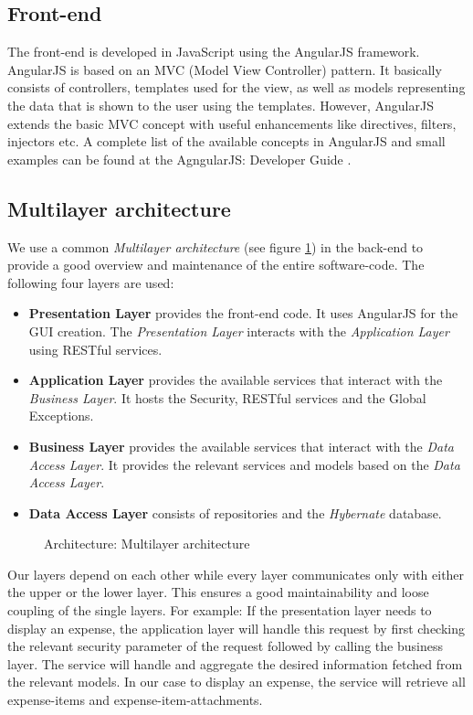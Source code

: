 \subsection{Front-end}
The front-end is developed in JavaScript using the AngularJS \cite{angular} framework. AngularJS is based on an MVC (Model View Controller) pattern. It basically consists of controllers, templates used for the view, as well as models representing the data that is shown to the user using the templates. However, AngularJS \cite{angular} extends the basic MVC concept with useful enhancements like directives, filters, injectors etc. A complete list of the available concepts in AngularJS and small examples can be found at the AgngularJS: Developer Guide \cite{angular-devguide}.

\subsection{Multilayer architecture}
We use a common \textit{Multilayer architecture} (see figure \ref{fig:architecture-layer}) in the back-end to provide a good overview and maintenance of the entire software-code. The following four layers are used:
\begin{itemize}
    \item \textbf{Presentation Layer} provides the front-end code. It uses AngularJS for the GUI creation. The \textit{Presentation Layer} interacts with the \textit{Application Layer} using RESTful services.
    \item \textbf{Application Layer} provides the available services that interact with the \textit{Business Layer}. It hosts the Security, RESTful services and the Global Exceptions.
    \item \textbf{Business Layer} provides the available services that interact with the \textit{Data Access Layer}. It provides the relevant services and models based on the \textit{Data Access Layer}.
    \item \textbf{Data Access Layer} consists of repositories and the \textit{Hybernate} database.
\end{itemize}

\begin{figure}[H]
    \centering
    \caption{Architecture: Multilayer architecture}
    \label{fig:architecture-layer}
\end{figure}

Our layers depend on each other while every layer communicates only with either the upper or the lower layer. This ensures a good maintainability and loose coupling of the single layers.\newline
For example: If the presentation layer needs to display an expense, the application layer will handle this request by first checking the relevant security parameter of the request followed by calling the business layer. The service will handle and aggregate the desired information fetched from the relevant models. In our case to display an expense, the service will retrieve all expense-items and expense-item-attachments.


